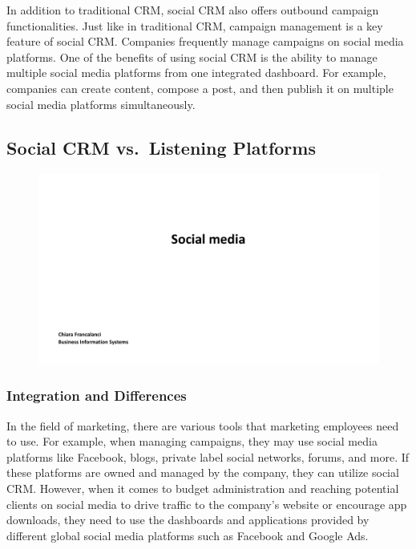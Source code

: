 In addition to traditional CRM, social CRM also offers outbound campaign
functionalities. Just like in traditional CRM, campaign management is a
key feature of social CRM. Companies frequently manage campaigns on
social media platforms. One of the benefits of using social CRM is the
ability to manage multiple social media platforms from one integrated
dashboard. For example, companies can create content, compose a post,
and then publish it on multiple social media platforms simultaneously.

\subsection{Social CRM vs.~Listening
    Platforms}\label{social-crm-vs.-listening-platforms}

\begin{figure}[!h]
    \centering
    \includegraphics[page=27, trim = 1.5cm 6cm 2.5cm 0.5cm, clip, width=\textwidth]{images/04 - Social_Media.pdf}
\end{figure}

\subsubsection{Integration and
    Differences}\label{integration-and-differences}

In the field of marketing, there are various tools that marketing
employees need to use. For example, when managing campaigns, they may
use social media platforms like Facebook, blogs, private label social
networks, forums, and more. If these platforms are owned and managed by
the company, they can utilize social CRM. However, when it comes to
budget administration and reaching potential clients on social media to
drive traffic to the company's website or encourage app downloads, they
need to use the dashboards and applications provided by different global
social media platforms such as Facebook and Google Ads.

